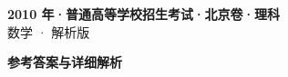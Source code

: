 \documentclass[zihao=-4, a4paper]{ctexart}
\begin{document}
\begin{center}
  {\Large\bfseries 2010 年·普通高等学校招生考试·北京卷·理科}\\[4pt]
  {\large 数学 · 解析版}
\end{center}
\medskip
{}

\clearpage
{}
\begin{center}{\Large\bfseries 参考答案与详细解析}\end{center}
\medskip

\end{document}
